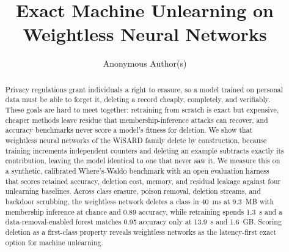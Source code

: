 \documentclass[12pt]{article}
\title{Exact Machine Unlearning on Weightless Neural Networks}
\author{Anonymous Author(s)\inst{1}}
\begin{document}
\maketitle

\begin{abstract}
Privacy regulations grant individuals a right to erasure, so a model trained on personal data must be able to forget it, deleting a record cheaply, completely, and verifiably. These goals are hard to meet together: retraining from scratch is exact but expensive, cheaper methods leave residue that membership-inference attacks can recover, and accuracy benchmarks never score a model's fitness for deletion. We show that weightless neural networks of the WiSARD family delete by construction, because training increments independent counters and deleting an example subtracts exactly its contribution, leaving the model identical to one that never saw it. We measure this on a synthetic, calibrated Where's-Waldo benchmark with an open evaluation harness that scores retained accuracy, deletion cost, memory, and residual leakage against four unlearning baselines. Across class erasure, poison removal, deletion streams, and backdoor scrubbing, the weightless network deletes a class in 40~ms at 9.3~MB with membership inference at chance and 0.89 accuracy, while retraining spends 1.3~s and a data-removal-enabled forest matches 0.95 accuracy only at 13.9~s and 1.6~GB. Scoring deletion as a first-class property reveals weightless networks as the latency-first exact option for machine unlearning.
\end{abstract}




\end{document}
